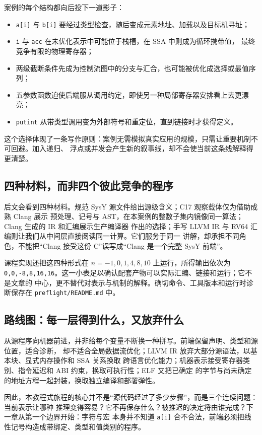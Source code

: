 案例的每个结构都向后投下一道影子：
\begin{itemize}
  \item \texttt{a[i]} 与 \texttt{b[i]} 要经过类型检查，随后变成元素地址、加载以及目标机寻址；
  \item \texttt{i} 与 \texttt{acc} 在未优化表示中可能位于栈槽，在 SSA 中则成为循环携带值，
        最终竞争有限的物理寄存器；
  \item 两级截断条件先成为控制流图中的分支与汇合，也可能被优化成选择或最值序列；
  \item 五参数函数迫使后端服从调用约定，即使另一种局部寄存器安排看上去更漂亮；
  \item \texttt{putint} 从带类型调用变为外部符号和重定位，直到链接时才获得定义。
\end{itemize}
这个选择体现了一条写作原则：案例无需模拟真实应用的规模，只需让重要机制不可回避。加入递归、
浮点或并发会产生新的叙事线，却不会使当前这条线解释得更清楚。

\subsection{四种材料，而非四个彼此竞争的程序}

后文会看到四种材料。规范 SysY 源文件给出源级含义；C17 观察载体仅为借助成熟 Clang 展示
预处理、记号与 AST，在本案例的整数子集内镜像同一算法；Clang 生成的 IR 和汇编展示生产编译器
作出的选择；手写 LLVM IR 与 RV64 汇编则让我们从中间层直接阅读同一计算。它们服务于同一
讲解，却承担不同角色，不能把“Clang 接受这份 C”误写成“Clang 是一个完整 SysY 前端”。

课程实现还把这四种形式在 $n=-1,0,1,4,8,10$ 上运行，所得输出依次为
\texttt{0,0,-8,8,16,16}。这一小表足以确认配套产物可以实际汇编、链接和运行；它不是文章的
中心，更不替代对表示与机制的解释。确切命令、工具版本和运行时诊断保存在
\texttt{preflight/README.md} 中。

\subsection{路线图：每一层得到什么，又放弃什么}

从源程序向机器前进，并非给每个变量不断换一种拼写。前端保留声明、类型和源位置，适合诊断，
却不适合全局数据流优化；LLVM IR 放弃大部分源语法，以基本块、显式内存操作和 SSA 关系换取
跨语言优化能力；机器表示接受寄存器类别、指令延迟和 ABI 约束，换取可执行性；ELF 又把已确定
的字节与尚未确定的地址方程一起封装，换取独立编译和部署弹性。

因此，本教程式旅程的核心并不是“源代码经过了多少步骤”，而是三个连续问题：当前表示让哪种
推理变得容易？它不再保存什么？被推迟的决定将由谁完成？下一章从第一个边界开始：字符与宏
本身并不知道 \texttt{a[i]} 合不合法，前端必须把线性记号构造成带绑定、类型和值类别的程序。
